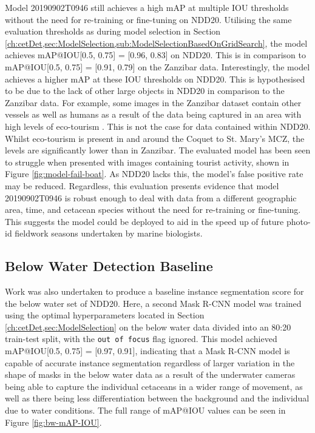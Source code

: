 Model 20190902T0946 still achieves a high mAP at multiple IOU thresholds without the need for re-training or fine-tuning on NDD20. Utilising the same evaluation thresholds as during model selection in Section \ref{ch:cetDet,sec:ModelSelection,sub:ModelSelectionBasedOnGridSearch}, the model achieves mAP@IOU[0.5, 0.75] = [0.96, 0.83] on NDD20. This is in comparison to mAP@IOU[0.5, 0.75] = [0.91, 0.79] on the Zanzibar data. Interestingly, the model achieves a higher mAP at these IOU thresholds on NDD20. This is hypothesised to be due to the lack of other large objects in NDD20 in comparison to the Zanzibar data. For example, some images in the Zanzibar dataset contain other vessels as well as humans as a result of the data being captured in an area with high levels of eco-tourism \cite{christiansen_effects_2010}. This is not the case for data contained within NDD20. Whilst eco-tourism is present in and around the Coquet to St. Mary's MCZ, the levels are significantly lower than in Zanzibar. The evaluated model has been seen to struggle when presented with images containing tourist activity, shown in Figure \ref{fig:model-fail-boat}. As NDD20 lacks this, the model's false positive rate may be reduced. Regardless, this evaluation presents evidence that model 20190902T0946 is robust enough to deal with data from a different geographic area, time, and cetacean species without the need for re-training or fine-tuning. This suggests the model could be deployed to aid in the speed up of future photo-id fieldwork seasons undertaken by marine biologists. 

\subsection{Below Water Detection Baseline}\label{ch:NDD,sec:EvalUsingNDD20,subsec:belowWaterDetectionBasleine}

Work was also undertaken to produce a baseline instance segmentation score for the below water set of NDD20. Here, a second Mask R-CNN model was trained using the optimal hyperparameters located in Section \ref{ch:cetDet,sec:ModelSelection} on the below water data divided into an 80:20 train-test split, with the \texttt{out of focus} flag ignored. This model achieved mAP@IOU[0.5, 0.75] = [0.97, 0.91], indicating that a Mask R-CNN model is capable of accurate instance segmentation regardless of larger variation in the shape of masks in the below water data as a result of the underwater cameras being able to capture the individual cetaceans in a wider range of movement, as well as there being less differentiation between the background and the individual due to water conditions. The full range of mAP@IOU values can be seen in Figure \ref{fig:bw-mAP-IOU}.

